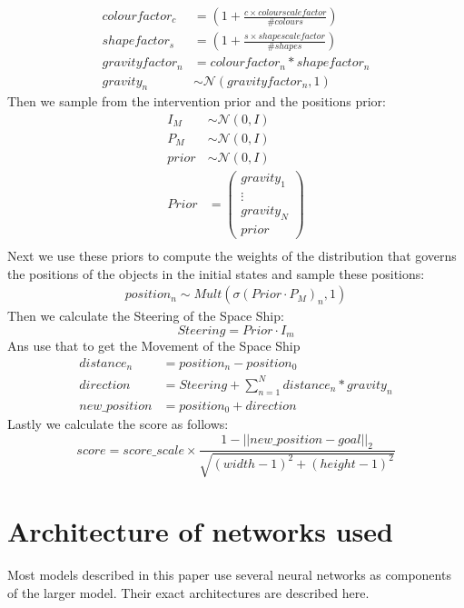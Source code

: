 \documentclass{report}
\newcommand{\Norm}{\mathcal{N}}
\begin{document}
\begin{appendices}
\begin{align}
    colour factor_c &= \left(1 + \frac{c \times colour scale factor}{\# colours} \right)\\
    shape factor_s &= \left(1 + \frac{s \times shape scale factor}{\#shapes}\right) \\
    gravity factor_n &= colour factor_n * shape factor_n \\
    gravity_n &\sim \Norm(gravity factor_n, 1)
\end{align}
Then we sample from the intervention prior and the positions prior:
\begin{align}
    I_M &\sim \Norm(0, I)\\
    P_M &\sim \Norm(0, I)\\
    prior &\sim \Norm(0, I)\\
    Prior &= \begin{pmatrix}gravity_1 \\ \vdots\\gravity_N \\ prior\end{pmatrix}\\
\end{align}
Next we use these priors to compute the weights of the distribution that governs the positions of the objects in the initial states and sample these positions:
\begin{align}
position_n \sim Mult(\sigma(Prior \cdot P_M)_n, 1)    
\end{align}
Then we calculate the Steering of the Space Ship:
\begin{equation}
    Steering = Prior \cdot I_m
\end{equation}
Ans use that to get the Movement of the Space Ship
\begin{align}
    distance_n &= position_n - position_0\\
    direction &= Steering +\sum\limits^N_{n=1} distance_n * gravity_n\\
    new\_position &= position_0 + direction
\end{align}
Lastly we calculate the score as follows:
\begin{equation}
    score = score\_scale \times \frac{1 - ||new\_position - goal ||_2}{\sqrt{(width - 1)^2 + (height-1)^2}}
\end{equation}


\chapter{Architecture of networks used}\label{appendix:architecture}
Most models described in this paper use several neural networks as components of the larger model. Their exact architectures are described here.


\end{appendices}
\end{document}
